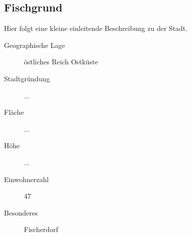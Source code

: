 \subsection{Fischgrund}
\par Hier folgt eine kleine einleitende Beschreibung zu der Stadt.

\begin{description}
\item [Geographische Lage] östliches Reich Ostküste
\item [Stadtgründung] ...
\item [Fläche] ...
\item [Höhe] ...
\item [Einwohnerzahl] 47
\item [Besonderes] Fischerdorf
\end{description}